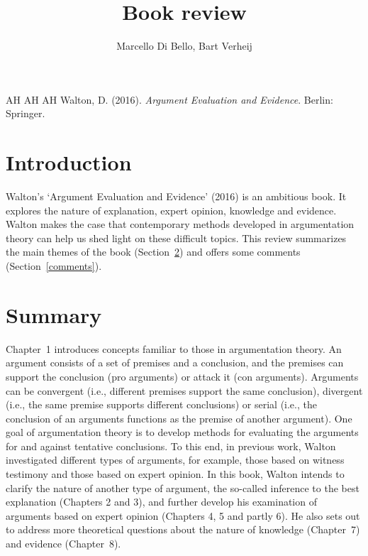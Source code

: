 \documentclass[12pt]{article}
\begin{document}
\title{Book review}

\author{}
\author{Marcello Di Bello, Bart Verheij}

\date{}

\maketitle


AH AH AH Walton, D. (2016). \emph{Argument Evaluation and Evidence}. Berlin: Springer.

\section{Introduction}

\noindent Walton's  `Argument Evaluation and Evidence' (2016) is an ambitious book. It explores the nature of explanation,
expert opinion, knowledge and evidence. Walton makes the case that
contemporary methods developed in argumentation theory can help us shed light on these difficult topics.
This review summarizes the main themes of the book (Section~\ref{summary}) and offers some comments (Section~\ref{comments}).

\section{Summary}
\label{summary}
\noindent Chapter~1 introduces concepts familiar to those in argumentation
theory. An argument consists of a set of premises and a conclusion,
and the premises can support the conclusion (pro arguments) or attack
it (con arguments). Arguments can be convergent (i.e., different
premises support the same conclusion), divergent (i.e., the same
premise supports different conclusions) or serial (i.e., the conclusion
of an arguments functions as the premise of another argument).
One goal of argumentation theory is to develop methods for evaluating the arguments for and against tentative conclusions. To this end, in previous work,
Walton investigated different types of arguments, for example, those
based on witness testimony and those based on expert opinion. In this
book, Walton intends to clarify the nature of another type of
argument, the so-called inference to the best explanation (Chapters 2
and 3), and further develop his examination of arguments based on
expert opinion (Chapters 4, 5 and partly 6). He also sets out to
address more theoretical questions about the nature of knowledge
(Chapter~7) and evidence (Chapter~8).
\end{document}
